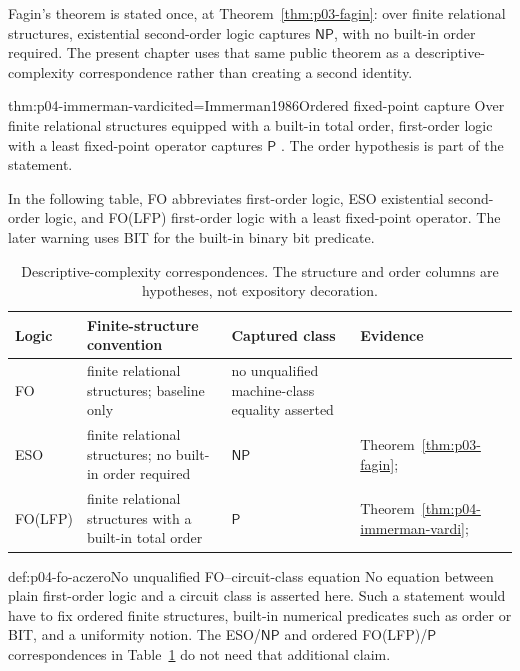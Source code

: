 Fagin's theorem is stated once, at
Theorem~\ref{thm:p03-fagin}: over finite relational structures,
existential second-order logic captures \(\mathsf{NP}\), with no built-in
order required.  The present chapter uses that same public theorem as a
descriptive-complexity correspondence rather than creating a second identity.

\begin{hbtheorem}{thm:p04-immerman-vardi}{cited=Immerman1986}{Ordered fixed-point capture}
Over finite relational structures equipped with a built-in total order,
first-order logic with a least fixed-point operator captures \(\mathsf P\)
\cite{Vardi1982}.  The order hypothesis is part of the statement.
\end{hbtheorem}

In the following table, FO abbreviates first-order logic, ESO existential
second-order logic, and FO(LFP) first-order logic with a least fixed-point
operator.  The later warning uses BIT for the built-in binary bit predicate.

\begin{table}[htbp]
\centering
\small
\begin{tabular}{@{}p{}p{}p{}p{}@{}}
\toprule
Logic & Finite-structure convention & Captured class & Evidence \\
\midrule
FO & finite relational structures; baseline only & no unqualified
machine-class equality asserted & \cite{Immerman1999} \\
ESO & finite relational structures; no built-in order required &
\(\mathsf{NP}\) & Theorem~\ref{thm:p03-fagin}; \cite{Fagin1974} \\
FO(LFP) & finite relational structures with a built-in total order &
\(\mathsf P\) & Theorem~\ref{thm:p04-immerman-vardi};
\cite{Immerman1986,Vardi1982} \\
\bottomrule
\end{tabular}
\caption{Descriptive-complexity correspondences.  The
structure and order columns are hypotheses, not expository decoration.}
\label{tab:p04-descriptive-complexity}
\end{table}

\begin{hbwarning}{def:p04-fo-aczero}{No unqualified FO--circuit-class equation}
No equation between plain first-order logic and a circuit class is asserted
here.  Such a statement would have to fix ordered finite structures,
built-in numerical predicates such as order or BIT, and a uniformity notion.
The ESO/\(\mathsf{NP}\) and ordered FO(LFP)/\(\mathsf P\) correspondences in
Table~\ref{tab:p04-descriptive-complexity} do not need that additional claim.
\end{hbwarning}


